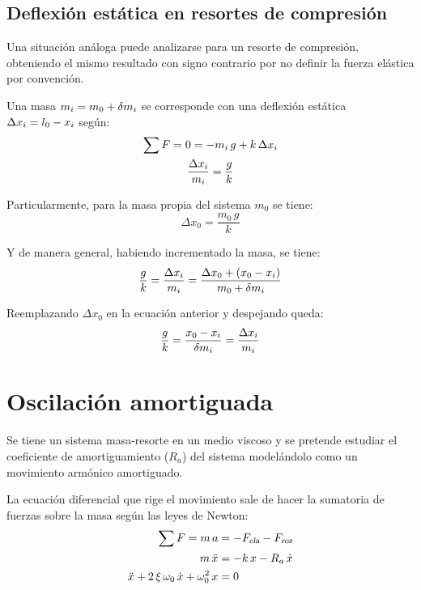 \subsection*{Deflexión estática en resortes de compresión}

Una situación análoga puede analizarse para un resorte de compresión, obteniendo el mismo resultado con signo contrario por no definir la fuerza elástica por convención.

\begin{center}
    \def\svgwidth{0.8\linewidth}
    
\end{center}

Una masa $m_i = m_0+\delta m_i$ se corresponde con una deflexión estática $\Delta x_i = l_0 - x_i$ según:
\begin{gather*}
    \sum F = 0 = -m_i \, g + k \, \Delta x_i
    \\
    \frac{\Delta x_i}{m_i} = \frac{g}{k}
\end{gather*}

Particularmente, para la masa propia del sistema $m_0$ se tiene:
\begin{equation*}
    \Delta x_0 = \frac{m_0 \, g}{k}
\end{equation*}

Y de manera general, habiendo incrementado la masa, se tiene:
\begin{equation*}
    \frac{g}{k} = \frac{\Delta x_i}{m_i} = \frac{\Delta x_0 + (x_0-x_i)}{m_0 + \delta m_i}
\end{equation*}

Reemplazando $\Delta x_0$ en la ecuación anterior y despejando queda:
\begin{equation*}
    \frac{g}{k} = \frac{x_0 - x_i}{\delta m_i} = \frac{\Delta x_i}{m_i}
\end{equation*}


\section{Oscilación amortiguada}

Se tiene un sistema masa-resorte en un medio viscoso y se pretende estudiar el coeficiente de amortiguamiento ($R_a$) del sistema modelándolo como un movimiento armónico amortiguado.

La ecuación diferencial que rige el movimiento sale de hacer la sumatoria de fuerzas sobre la masa según las leyes de Newton:
\begin{align*}
    \sum F = m \, a &= -{{F}_\textsl{{ela}}} - {{F}_\textsl{{roz}}}
    \\
    m \, \ddot{x} &= -k \, x - R_a \, \dot{x}
    \\
    \ddot{x} + 2 \, \xi \, \omega_0 \, \dot{x} + \omega_0^2 \, x &= 0
\end{align*}

